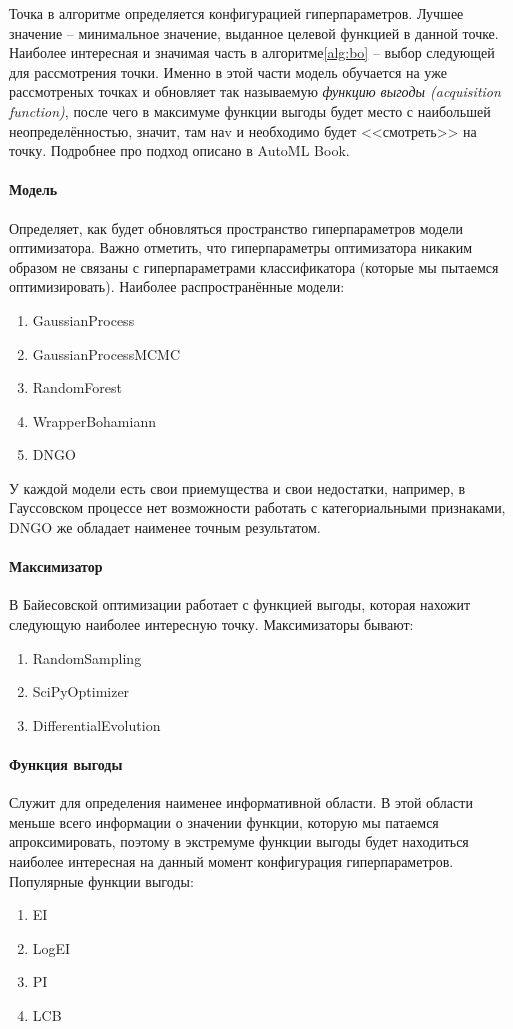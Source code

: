 \documentclass[times,specification,annotation]{itmo-student-thesis}
\begin{document}
	Точка в алгоритме определяется конфигурацией гиперпараметров. Лучшее значение -- минимальное значение, выданное целевой функцией в данной точке. Наиболее интересная и значимая часть в алгоритме\ref{alg:bo} -- выбор следующей для рассмотрения точки. Именно в этой части модель обучается на уже рассмотреных точках и обновляет так называемую \textit{функцию выгоды (acquisition function)}, после чего в максимуме функции выгоды будет место с наибольшей неопределённостью, значит, там наv и необходимо будет <<смотреть>> на точку. Подробнее про подход описано в AutoML Book\cite{automlbook19a}.

	\paragraph{Модель} Определяет, как будет обновляться пространство гиперпараметров модели оптимизатора. Важно отметить, что гиперпараметры оптимизатора никаким образом не связаны с гиперпараметрами классификатора (которые мы пытаемся оптимизировать). Наиболее распространённые модели:
	\begin{enumerate}
		\item GaussianProcess \label{nm:gp}
		\item GaussianProcessMCMC
		\item RandomForest \label{nm:rf}
		\item WrapperBohamiann
		\item DNGO
	\end{enumerate}
	У каждой модели есть свои приемущества и свои недостатки, например, в Гауссовском процессе нет возможности работать с категориальными признаками, DNGO же обладает наименее точным результатом.
	\paragraph{Максимизатор} В Байесовской оптимизации работает с функцией выгоды, которая нахожит следующую наиболее интересную точку. Максимизаторы бывают:
	\begin{enumerate}
		\item RandomSampling
		\item SciPyOptimizer
		\item DifferentialEvolution
	\end{enumerate}
	\paragraph{Функция выгоды} Служит для определения наименее информативной области. В этой области меньше всего информации о значении функции, которую мы патаемся апроксимировать, поэтому в экстремуме функции выгоды будет находиться наиболее интересная на данный момент конфигурация гиперпараметров. Популярные функции выгоды:
	\begin{enumerate}
		\item EI
		\item LogEI
		\item PI
		\item LCB
	\end{enumerate}
\end{document}
